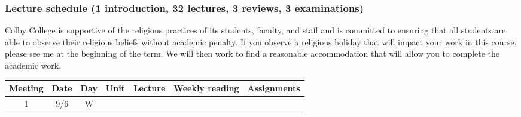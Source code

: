 \documentclass[]{article}
\begin{document}
\subsubsection{Lecture schedule (1 introduction, 32 lectures, 3 reviews,
3 examinations)
}\label{lecture-schedule-1-introduction-32-lectures-3-reviews-3-examinations}

Colby College is supportive of the religious practices of its students,
faculty, and staff and is committed to ensuring that all students are
able to observe their religious beliefs without academic penalty. If you
observe a religious holiday that will impact your work in this course,
please see me at the beginning of the term. We will then work to find a
reasonable accommodation that will allow you to complete the academic
work.

\begin{longtable}[]{@{}cccllll@{}}
\toprule
\begin{minipage}[b]{0.12\columnwidth}\centering\strut
Meeting\strut
\end{minipage} & \begin{minipage}[b]{0.08\columnwidth}\centering\strut
Date\strut
\end{minipage} & \begin{minipage}[b]{0.07\columnwidth}\centering\strut
Day\strut
\end{minipage} & \begin{minipage}[b]{0.10\columnwidth}\raggedright\strut
Unit\strut
\end{minipage} & \begin{minipage}[b]{0.11\columnwidth}\raggedright\strut
Lecture\strut
\end{minipage} & \begin{minipage}[b]{0.11\columnwidth}\raggedright\strut
Weekly reading\strut
\end{minipage} & \begin{minipage}[b]{0.16\columnwidth}\raggedright\strut
Assignments\strut
\end{minipage}\tabularnewline
\midrule
\endhead
\begin{minipage}[t]{0.12\columnwidth}\centering\strut
1\strut
\end{minipage} & \begin{minipage}[t]{0.08\columnwidth}\centering\strut
9/6\strut
\end{minipage} & \begin{minipage}[t]{0.07\columnwidth}\centering\strut
W\strut
\end{minipage} & \begin{minipage}[t]{0.10\columnwidth}\raggedright\strut

\end{minipage}
\end{longtable}
\end{document}
